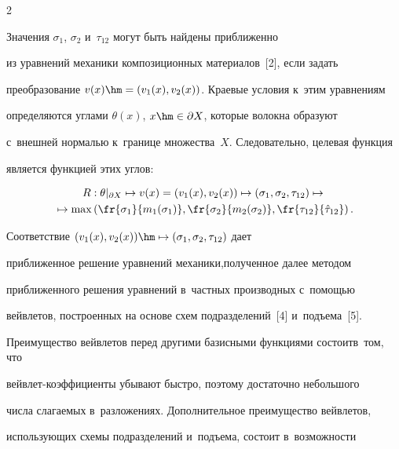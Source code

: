 \begin{multicols}{2}
  


  Значения $\sigma_1$, $\sigma_2$ и~$\tau_{12}$ могут быть найдены при\-бли\-жен\-но 


из уравнений механики композиционных материалов~[2], если задать 


преобразование $v(x)\hm= (v_1(x), v_2(x))$. Краевые условия к~этим уравнениям 


определяются углами $\theta(x)$, $x\hm\in \partial X$, которые волокна образуют 


с~внеш\-ней нормалью к~границе множества~$X$. Следовательно, целевая функция 


является функцией этих углов:


 \begin{multline*}


  R: \theta\vert_{\partial X} \mapsto v(x)=\left( v_1(x), v_2(x)\right)\mapsto \left( 


\sigma_1, \sigma_2, \tau_{12}\right) \mapsto {}\hspace*{-1.3625pt}\\


{}\mapsto \max \left( 


\fr{\sigma_1}{m_1(\sigma_1)}, \fr{\sigma_2}{m_2(\sigma_2)}, 


\fr{\tau_{12}}{\hat{\tau}_{12}}\right).


\end{multline*}


  


  Соответствие $(v_1(x), v_2(x)) \hm\mapsto (\sigma_1, \sigma_2, \tau_{12})$ дает 


приближенное решение уравнений механики,\linebreak полученное далее методом 


приближенного решения уравнений в~част\-ных производных с~по\-мощью\linebreak 


вейв\-ле\-тов, построенных на основе схем подразделений~[4] и~подъема~[5]. 


Преимущество вейвлетов перед другими базисными функциями состоит\linebreak в~том, что 


вейв\-лет-ко\-эф\-фи\-ци\-ен\-ты убывают быст\-ро, поэтому достаточно небольшого 


числа сла\-га\-емых в~разложениях. Дополнительное преимущество вейвлетов, 


использующих схемы \mbox{подразделений} и~подъема, со\-сто\-ит в~воз\-мож\-ности 



\end{multicols}
